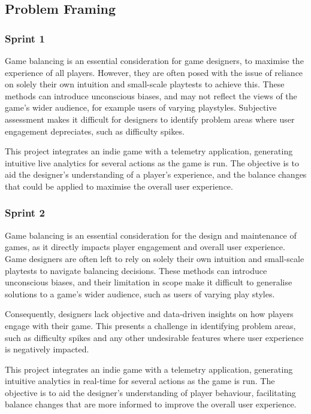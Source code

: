 \subsection{Problem Framing}
\subsubsection{Sprint 1}
Game balancing is an essential consideration for game designers, to maximise the experience of all players. However, they are often posed with the issue of reliance on solely their own intuition and small-scale playtests to achieve this. These methods can introduce unconscious biases, and may not reflect the views of the game’s wider audience, for example users of varying playstyles. Subjective assessment makes it difficult for designers to identify problem areas where user engagement depreciates, such as difficulty spikes.

This project integrates an indie game with a telemetry application, generating intuitive live analytics for several actions as the game is run. The objective is to aid the designer’s understanding of a player’s experience, and the balance changes that could be applied to maximise the overall user experience.

\subsubsection{Sprint 2}
Game balancing is an essential consideration for the design and maintenance of games, as it directly impacts player engagement and overall user experience.
Game designers are often left to rely on solely their own intuition and small-scale playtests to navigate balancing decisions.
These methods can introduce unconscious biases, and their limitation in scope make it difficult to generalise solutions to a game's wider audience, such as users of varying play styles.

Consequently, designers lack objective and data-driven insights on how players engage with their game.
This presents a challenge in identifying problem areas, such as difficulty spikes and any other undesirable features where user experience is negatively impacted.

This project integrates an indie game with a telemetry application, generating intuitive analytics in real-time for several actions as the game is run.
The objective is to aid the designer's understanding of player behaviour, facilitating balance changes that are more informed to improve the overall user experience.
